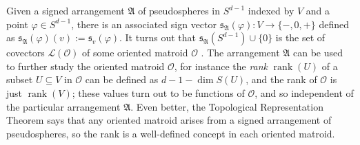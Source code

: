 \documentclass[a4paper,11pt,reqno, english]{amsart}
\theoremstyle{definition}
\theoremstyle{remark}
\begin{document}
Given a signed arrangement $\mathfrak{A}$ of pseudospheres in $S^{d-1}$ indexed by $V$ and a point $\varphi\in S^{d-1}$, there is an associated sign vector $\mathfrak{s}_\mathfrak{A}(\varphi)\colon V\to\{-,0,+\}$ defined as $\mathfrak{s}_\mathfrak{A}(\varphi)(v):=\mathfrak{s}_v(\varphi)$. It turns out that $\mathfrak{s}_\mathfrak{A}(S^{d-1})\cup\{0\}$ is the set of covectors $\mathscr{L}(\mathscr{O})$ of some oriented matroid $\mathscr{O}$ \cite[Theorem 5.1.4]{OrientedMatroids}. The arrangement $\mathfrak{A}$ can be used to further study the oriented matroid $\mathscr{O}$, for instance the \emph{rank} $\operatorname{rank}(U)$ of a subset $U\subseteq V$ in $\mathscr{O}$ can be defined as $d-1-\dim S(U)$, and the rank of $\mathscr{O}$ is just $\operatorname{rank}(V)$; these values turn out to be functions of $\mathscr{O}$, and so independent of the particular arrangement $\mathfrak{A}$. Even better, the Topological Representation Theorem says that any oriented matroid arises from a signed arrangement of pseudospheres, so the rank is a well-defined concept in each oriented matroid.
\end{document}
